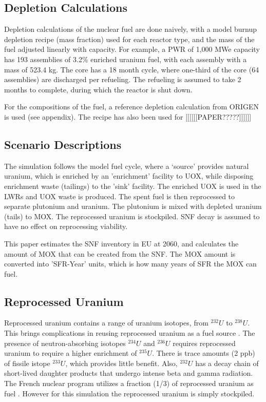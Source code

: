 \subsection{Depletion Calculations}
Depletion calculations of the nuclear fuel are done
naively, with a model burnup depletion recipe (mass fraction) used
for each reactor type, and the mass of the fuel 
adjusted linearly with capacity. For example, a PWR of
1,000 MWe capacity has 193 assemblies of 3.2\% enriched
uranium fuel, with each assembly with a mass of 523.4 kg.
The core has a 18 month cycle, where one-third of the 
core (64 assemblies) are discharged per refueling. The refueling
is assumed to take 2 months to complete, during which the reactor
is shut down. 

For the compositions of the fuel, a reference depletion calculation
from ORIGEN is used (see appendix). The recipe has also been used for
[[[[[[PAPER?????]]]]]]

\subsection{Scenario Descriptions}
The simulation follows the model fuel cycle, where a `source'
provides natural uranium, which is enriched by an 'enrichment'
facility to \gls{UOX}, while disposing enrichment waste (tailings)
to the 'sink' facility. The enriched \gls{UOX} is used
in the \gls{LWR}s and \gls{UOX} waste is produced. The spent fuel
is then reprocessed to separate plutonium and uranium.
The plutonium is mixed with depleted uranium (tails) to \gls{MOX}.
The reprocessed uranium is stockpiled. \gls{SNF} decay is assumed
to have no effect on reprocessing viability.

This paper estimates the \gls{SNF} inventory in EU at 2060,
and calculates the amount of \gls{MOX} that can be created from the \gls{SNF}.
The \gls{MOX} amount is converted into 'SFR-Year' units, which is how many
years of SFR the \gls{MOX} can fuel.



\subsection{Reprocessed Uranium}
Reprocessed uranium contains a range of uranium isotopes, from $^{232}U$ to $^{238}U$.
This brings complications in reusing reprocessed uranium as a fuel source \cite{IAEA_management_2007}.
The presence of neutron-absorbing isotopes $^{234}U$ and $^{236}U$ requires reprocessed uranium
to require a higher enrichment of $^{235}U$. There is trace amounts (2 ppb) of fissile istope $^{233}U$,
which provides little benefit.  
Also, $^{232}U$ has a decay chain of short-lived
daughter products that undergo intense beta and gamma radiation.
The French nuclear program utilizes a fraction (1/3) of reprocessed uranium as fuel \cite{IAEA_management_200&}.
However for this simulation the reprocessed uranium is simply stockpiled.


